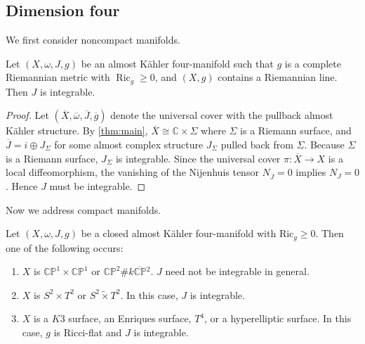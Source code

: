 \documentclass[11pt,twoside]{amsart}
\DeclareMathOperator{\Ric}{Ric}
\newcommand{\C}{\mathbb{C}}
\renewcommand{\tilde}{\widetilde}
\begin{document}
\subsection{Dimension four}
We first consider noncompact manifolds.
\begin{lemma}\label{lem:noncompact}
    Let $(X,\omega, J, g)$ be an almost K\"ahler four-manifold such that $g$ is a complete Riemannian metric with $\Ric_g\geq 0$, and $(X,g)$ contains a Riemannian line. Then $J$ is integrable.
\end{lemma}
    \begin{proof}
    Let $(\overline X, \overline \omega, \overline J, \overline  g)$ denote the universal cover with the pullback almost K\"ahler structure. 
    By \autoref{thm:main}, $\overline X \cong \C \times \Sigma$ where $\Sigma$ is a Riemann surface, and $\overline J = i\oplus J_\Sigma$ for some almost complex structure $J_\Sigma$ pulled back from $\Sigma$. Because $\Sigma$ is a Riemann surface, $J_\Sigma$ is integrable. Since the universal cover $\pi \colon \overline X \to X$ is a local diffeomorphism, the vanishing of the Nijenhuis tensor $N_{\overline J} = 0$ implies $N_J = 0$. Hence $J$ must be integrable.
    \end{proof}

Now we address compact manifolds. 

\begin{theorem}\label{thm:dim4}
Let $(X,\omega,J,g)$ be a closed almost K\"ahler four-manifold with $\text{Ric}_g\geq0$. Then one of the following occurs:
\begin{enumerate}[nosep]
    \item $X$ is $\mathbb{CP}^1\times\mathbb{CP}^1$ or  $\mathbb{CP}^2\#k\overline{\mathbb{CP}}{}^2$. $J$ need not be integrable in general.
    \item $X$ is $S^2\times T^2$ or $S^2\tilde{\times}T^2$. In this case, $J$ is integrable.
    \item $X$ is a $K3$ surface, an Enriques surface,
    $T^4$, or a hyperelliptic surface. In this case, $g$ is Ricci-flat and $J$ is integrable.
\end{enumerate}
\end{theorem}
\end{document}
